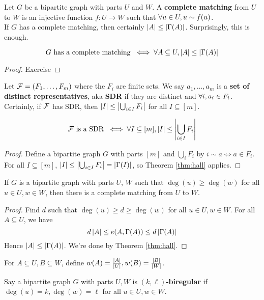 \documentclass{article}
\begin{document}
Let $G$ be a bipartite graph with parts $U$ and $W$. A {\bf complete matching} from $U$ to $W$ is an injective function $f : U \to W$ such that $\forall u \in U, u \sim f(u)$. \\
If $G$ has a complete matching, then certainly $\left\lvert A\right\rvert \le \left\lvert \Gamma(A)\right\rvert$. Surprisingly, this is enough.

\begin{nthm}\label{thm:hall}
  $$G \text{ has a complete matching } \iff \forall A \subseteq U, \left\lvert A\right\rvert \le \left\lvert \Gamma(A)\right\rvert$$
\end{nthm}
\begin{proof}
  Exercise
\end{proof}

Let $\mathcal F = (F_1, \dots, F_m)$ where the $F_i$ are finite sets. We say $a_1, \dots, a_m$ is a {\bf set of distinct representatives}, aka {\bf SDR} if they are distinct and $\forall i, a_i \in F_i$. Certainly, if $\mathcal F$ has SDR, then $\left\lvert I\right\rvert \le \left\lvert \bigcup_{i \in I} F_i\right\rvert$ for all $I \subseteq [m]$.

\begin{nthm}
  $$\mathcal F \text{ is a SDR } \iff \forall I \subseteq [m], \left\lvert I\right\rvert \le \left\lvert \bigcup_{i \in I} F_i\right\rvert$$
\end{nthm}
\begin{proof}
  Define a bipartite graph $G$ with parts $[m]$ and $\bigcup_i F_i$ by $i \sim a \iff a \in F_i$. For all $I \subseteq [m]$, $\left\lvert I\right\rvert \le \left\lvert \bigcup_{i \in I} F_i\right\rvert = \left\lvert \Gamma(I)\right\rvert$, so Theorem \ref{thm:hall} applies.
\end{proof}

\begin{nthm}
  If $G$ is a bipartite graph with parts $U$, $W$ such that $\deg(u) \ge \deg(w)$ for all $u \in U, w \in W$, then there is a complete matching from $U$ to $W$.
\end{nthm}
\begin{proof}
  Find $d$ such that $\deg(u) \ge d \ge \deg(w)$ for all $u \in U, w \in W$. For all $A \subseteq U$, we have
  $$d\left\lvert A\right\rvert \le e(A, \Gamma(A)) \le d\left\lvert \Gamma(A)\right\rvert$$
  Hence $\left\lvert A\right\rvert \le \left\lvert \Gamma(A)\right\rvert$. We're done by Theorem \ref{thm:hall}.
\end{proof}

For $A \subseteq U, B \subseteq W$, define $w(A) = \frac{\left\lvert A\right\rvert}{\left\lvert U\right\rvert}, w(B) = \frac{\left\lvert B\right\rvert}{\left\lvert W\right\rvert}$.

Say a bipartite graph $G$ with parts $U, W$ is {\bf $(k, \ell)$-biregular} if
$\deg(u) = k, \deg(w) = \ell$ for all $u \in U, w \in W$.
\end{document}
